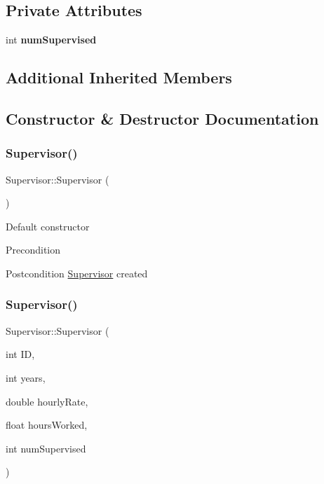 \subsection*{Private Attributes}
\begin{DoxyCompactItemize}
\item 
\mbox{\label{classSupervisor_af8b7097d8147c93a68d1f63c5b898797}} 
int {\bfseries num\+Supervised}
\end{DoxyCompactItemize}
\subsection*{Additional Inherited Members}


\subsection{Constructor \& Destructor Documentation}
\mbox{\label{classSupervisor_a9d7eafc36b5429092ba0f758bc7841c4}} 
\subsubsection{\texorpdfstring{Supervisor()}{Supervisor()}\hspace{0.1cm}{\footnotesize\ttfamily [1/2]}}
{\footnotesize\ttfamily Supervisor\+::\+Supervisor (\begin{DoxyParamCaption}{ }\end{DoxyParamCaption})}

Default constructor

\begin{DoxyPrecond}{Precondition}

\end{DoxyPrecond}
\begin{DoxyPostcond}{Postcondition}
\hyperlink{classSupervisor}{Supervisor} created 
\end{DoxyPostcond}
\mbox{\label{classSupervisor_a02d9245744652deb20e9408001d6ed3b}} 
\subsubsection{\texorpdfstring{Supervisor()}{Supervisor()}\hspace{0.1cm}{\footnotesize\ttfamily [2/2]}}
{\footnotesize\ttfamily Supervisor\+::\+Supervisor (\begin{DoxyParamCaption}\item[{int}]{ID,  }\item[{int}]{years,  }\item[{double}]{hourly\+Rate,  }\item[{float}]{hours\+Worked,  }\item[{int}]{num\+Supervised }\end{DoxyParamCaption})}

